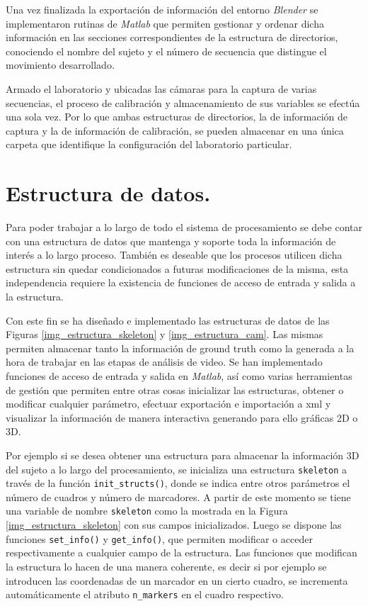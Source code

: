 Una vez finalizada la exportación de información del entorno \textit{Blender} se implementaron rutinas de \textit{Matlab} que permiten gestionar y ordenar dicha información en las secciones correspondientes de la estructura de directorios, conociendo el nombre del sujeto y el número de secuencia que distingue el movimiento desarrollado. 

Armado el laboratorio y ubicadas las cámaras para la captura de varias secuencias, el proceso de calibración y almacenamiento de sus variables se efectúa una sola vez. Por lo que ambas estructuras de directorios, la de información de captura y la de información de calibración,  se pueden almacenar en una única carpeta que identifique la configuración del laboratorio particular.  



\section{Estructura de datos.}
\label{section_Estructura_de_datos}
Para poder trabajar a lo largo de todo el sistema de procesamiento se debe contar con una estructura de datos que mantenga y soporte toda la información de interés a lo largo proceso. También es deseable que los procesos utilicen dicha estructura sin quedar condicionados a futuras modificaciones de la misma, esta independencia requiere la existencia de funciones de acceso de entrada y salida a la estructura.  


Con este fin se ha diseñado e implementado las estructuras de datos de las Figuras \ref{img_estructura_skeleton} y \ref{img_estructura_cam}.
Las mismas permiten almacenar tanto la información de ground truth como la generada a la hora de  trabajar en las etapas de análisis de video. Se han implementado funciones de acceso de entrada y salida en \textit{Matlab}, así como varias herramientas de gestión que permiten entre otras cosas inicializar las estructuras, obtener o modificar cualquier parámetro, efectuar exportación e importación a xml y visualizar la información de manera interactiva generando para ello gráficas 2D o 3D. 


Por ejemplo si se desea obtener una estructura para almacenar la información 3D del sujeto a lo largo del procesamiento, se inicializa una estructura \texttt{skeleton} a través de la función \texttt{init\_structs()}, donde se indica entre otros parámetros el número de cuadros y número de marcadores. 
A partir de este momento se tiene una variable de nombre \texttt{skeleton} como la mostrada en la Figura \ref{img_estructura_skeleton} con sus campos inicializados. Luego se dispone las funciones \texttt{set\_info()} y \texttt{get\_info()}, que permiten modificar o acceder respectivamente a cualquier campo de la estructura. Las funciones que modifican la estructura lo hacen de una manera coherente, es decir si por ejemplo se introducen las coordenadas de un marcador en un cierto cuadro, se incrementa automáticamente el atributo \texttt{n\_markers} en el cuadro respectivo.

